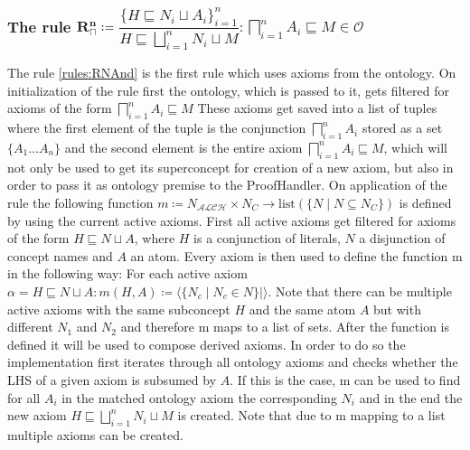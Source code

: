 \documentclass[titlepage]{article}
\begin{document}
\subsubsection{The rule $\mathbf{R^{n}_{\sqcap}} \coloneq \dfrac{\{H \sqsubseteq N_i \sqcup A_i \}^{n}_{i=1}}{H \sqsubseteq \bigsqcup^{n}_{i=1} N_i \sqcup M} : \bigsqcap^{n}_{i=1} A_i \sqsubseteq M \in \mathcal{O} \label{rules:RNAnd}$}
The rule \ref{rules:RNAnd} is the first rule which uses axioms from the ontology.
On initialization of the rule first the ontology, which is passed to it, 
gets filtered for axioms of the form $\bigsqcap^{n}_{i=1} A_i \sqsubseteq M$
These axioms get saved into a list of tuples where the first element of the tuple is the conjunction
$\bigsqcap^{n}_{i=1} A_i$
stored as a set $\{A_1 \ldots A_n\}$ and the second element is the entire axiom $\bigsqcap^{n}_{i=1} A_i \sqsubseteq M$, 
which will not only be used to get its superconcept
for creation of a new axiom, but also in order to pass it as ontology premise to the ProofHandler.
On application of the rule the following 
function $m  \coloneqq N_{\mathcal{ALCH}} \times N_C \rightarrow \text{list}(\{N \mid N \subseteq N_C\})$
is defined by using the current active axioms. First all active axioms get filtered for
axioms of the form $H \sqsubseteq N \sqcup A$, where $H$ is a conjunction of literals, $N$ a disjunction
 of concept names and $A$ an atom. Every axiom is then used to define the function m in the following way:
 For each active axiom $\alpha = H \sqsubseteq N \sqcup A: m(H,A) \coloneqq \langle \{N_c \mid N_c \in N\} \mid \rangle$.
 Note that there can be multiple active axioms with the same subconcept $H$ and the same atom $A$ but with different 
 $N_1$ and $N_2$ and therefore m maps to a list of sets.
 After the function is defined it will be used to compose derived axioms.
 In order to do so the implementation first iterates through all ontology axioms and checks
 whether the LHS of a given axiom is subsumed by $A$. If this is
 the case, m can be used to find for all $A_i$ in the matched ontology axiom the corresponding
 $N_i$ and in the end the new axiom $H \sqsubseteq \bigsqcup^{n}_{i=1} N_i \sqcup M$ is created.
 Note that due to m mapping to a list multiple axioms can be created. 



\end{document}
